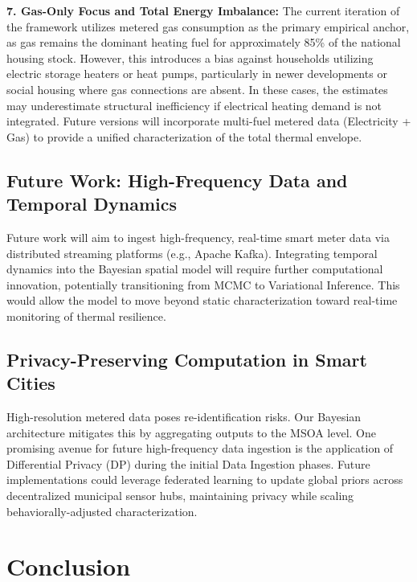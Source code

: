 \documentclass[11pt, a4paper, twocolumn]{article}
\begin{document}
\textbf{7. Gas-Only Focus and Total Energy Imbalance:} The current 
iteration of the framework utilizes metered gas consumption as the 
primary empirical anchor, as gas remains the dominant heating fuel for 
approximately 85\% of the national housing stock. However, this 
introduces a bias against households utilizing electric storage heaters 
or heat pumps, particularly in newer developments or social housing 
where gas connections are absent. In these cases, the estimates may 
underestimate structural inefficiency if electrical heating demand is 
not integrated. Future versions will incorporate multi-fuel metered data 
(Electricity + Gas) to provide a unified characterization of the total 
thermal envelope.

\subsection{Future Work: High-Frequency Data and Temporal 
Dynamics}\label{future-work-high-frequency-data-and-temporal-dynamics}

Future work will aim to ingest high-frequency, real-time smart meter 
data via distributed streaming platforms (e.g., Apache Kafka). 
Integrating temporal dynamics into the Bayesian spatial model will 
require further computational innovation, potentially transitioning from 
MCMC to Variational Inference. This would allow the model to move beyond 
static characterization toward real-time monitoring of thermal 
resilience.

\subsection{Privacy-Preserving Computation in Smart 
Cities}\label{privacy-preserving-computation-in-smart-cities}

High-resolution metered data poses re-identification risks. Our Bayesian 
architecture mitigates this by aggregating outputs to the MSOA level. 
One promising avenue for future high-frequency data ingestion is the 
application of Differential Privacy (DP) during the initial Data 
Ingestion phases. Future implementations could leverage federated 
learning to update global priors across decentralized municipal sensor 
hubs, maintaining privacy while scaling behaviorally-adjusted 
characterization.

\section{Conclusion}\label{conclusion}
\end{document}
